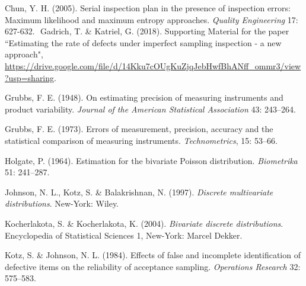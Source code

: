 \documentclass[a4paper,10pt,twoside]{article}
\begin{document}
{\begin{thebibliography}{3}
	 Chun, Y. H. (2005). Serial inspection plan in the presence of inspection errors: Maximum likelihood and maximum entropy approaches. {\em Quality Engineering} 17: 627-632.‏
%	
	‏
%	
 Gadrich, T. \& Katriel, G. (2018). Supporting Material for the paper ``Estimating the rate of defects under imperfect sampling inspection - a new approach",\\
{\small{{\url{https://drive.google.com/file/d/14Kku7cOUgKuZjqJebHwfBhANff_ommr3/view?usp=sharing}}}}.

 Grubbs, F. E. (1948). On estimating precision of measuring instruments and product variability. {\em{Journal of the American Statistical Association}} 43: 243--264.‏

 Grubbs, F. E. (1973). Errors of measurement, precision, accuracy and the statistical comparison of measuring instruments. {\em{Technometrics}}, 15: 53--66.

	 Holgate, P. (1964). Estimation for the bivariate Poisson distribution. {\em Biometrika}  51: 241--287.
	
	 Johnson, N. L., Kotz, S. \&  Balakrishnan, N. (1997). {\em Discrete multivariate distributions}.  New-York: Wiley.
	
	
%	

 Kocherlakota, S. \& Kocherlakota, K. (2004). {\em{Bivariate discrete distributions}}. Encyclopedia of Statistical Sciences 1, New-York: Marcel Dekker.

	Kotz, S. \&  Johnson, N. L. (1984). Effects of false and incomplete identification of defective items on the reliability of acceptance sampling. {\em Operations Research} 32: 575--583.
	

\end{thebibliography}}
\end{document}
